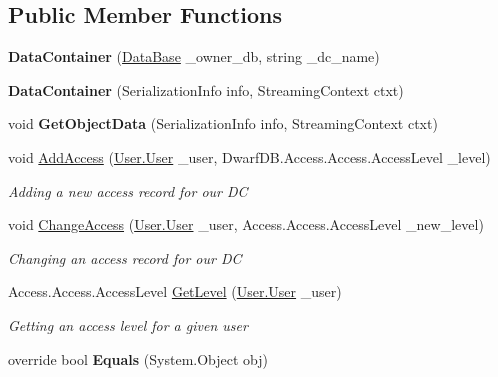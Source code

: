 \subsection*{Public Member Functions}
\begin{DoxyCompactItemize}
\item 
\hypertarget{class_dwarf_d_b_1_1_data_structures_1_1_data_container_aaef12033ab5b4b00fde86e41f4bfece2}{{\bfseries Data\+Container} (\hyperlink{class_dwarf_d_b_1_1_data_structures_1_1_data_base}{Data\+Base} \+\_\+owner\+\_\+db, string \+\_\+dc\+\_\+name)}\label{class_dwarf_d_b_1_1_data_structures_1_1_data_container_aaef12033ab5b4b00fde86e41f4bfece2}

\item 
\hypertarget{class_dwarf_d_b_1_1_data_structures_1_1_data_container_aedc4383268fbcc1f26b90e013cb9480a}{{\bfseries Data\+Container} (Serialization\+Info info, Streaming\+Context ctxt)}\label{class_dwarf_d_b_1_1_data_structures_1_1_data_container_aedc4383268fbcc1f26b90e013cb9480a}

\item 
\hypertarget{class_dwarf_d_b_1_1_data_structures_1_1_data_container_a2b870066d9ec71502d57a034c8beb610}{void {\bfseries Get\+Object\+Data} (Serialization\+Info info, Streaming\+Context ctxt)}\label{class_dwarf_d_b_1_1_data_structures_1_1_data_container_a2b870066d9ec71502d57a034c8beb610}

\item 
void \hyperlink{class_dwarf_d_b_1_1_data_structures_1_1_data_container_ae4044ec9ce657af53ee87f365c2c6b89}{Add\+Access} (\hyperlink{class_dwarf_d_b_1_1_user_1_1_user}{User.\+User} \+\_\+user, Dwarf\+D\+B.\+Access.\+Access.\+Access\+Level \+\_\+level)
\begin{DoxyCompactList}\small\item\em Adding a new access record for our D\+C \end{DoxyCompactList}\item 
void \hyperlink{class_dwarf_d_b_1_1_data_structures_1_1_data_container_a612995b0e084035ae6bcb7cb14b41f14}{Change\+Access} (\hyperlink{class_dwarf_d_b_1_1_user_1_1_user}{User.\+User} \+\_\+user, Access.\+Access.\+Access\+Level \+\_\+new\+\_\+level)
\begin{DoxyCompactList}\small\item\em Changing an access record for our D\+C \end{DoxyCompactList}\item 
Access.\+Access.\+Access\+Level \hyperlink{class_dwarf_d_b_1_1_data_structures_1_1_data_container_ad268483590eb3c6db9f2a71519ab4b6c}{Get\+Level} (\hyperlink{class_dwarf_d_b_1_1_user_1_1_user}{User.\+User} \+\_\+user)
\begin{DoxyCompactList}\small\item\em Getting an access level for a given user \end{DoxyCompactList}\item 
\hypertarget{class_dwarf_d_b_1_1_data_structures_1_1_data_container_a6cb4a4c31f7e46f814632fc161024ac1}{override bool {\bfseries Equals} (System.\+Object obj)}\label{class_dwarf_d_b_1_1_data_structures_1_1_data_container_a6cb4a4c31f7e46f814632fc161024ac1}


\end{DoxyCompactItemize}
